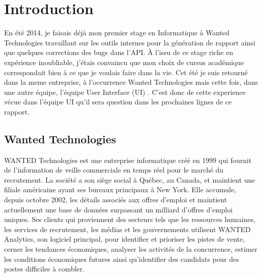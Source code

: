 
%
%

\chapter{Introduction}
\label{s:intro}

En été 2014, je faisais déjà mon premier stage en Informatique à Wanted Technologies travaillant sur les outils internes pour la génération de rapport ainsi que quelques corrections des bugs dans l'API. À l'issu de ce stage riche en expérience inoubliable, j'étais convaincu que mon choix de cursus académique correspondait bien à ce que je voulais faire dans la vie.
Cet été je suis retourné dans la meme entreprise, à l'occurrence Wanted Technologies mais cette fois, dans une autre équipe, l'équipe User Interface (UI) . C'est donc de cette experience vécue dans l'équipe UI qu'il sera question dans les prochaines lignes de ce rapport. 


\section{Wanted Technologies}
\label{about_wanted}

WANTED Technologies est une entreprise informatique créé en 1999 qui fournit de l'information de veille commerciale en temps réel pour le marché du recrutement. La société a son siège social à Québec, au Canada, et maintient une filiale américaine ayant ses bureaux principaux à New York. Elle accumule, depuis octobre 2002, les détails associés aux offres d'emploi et maintient actuellement une base de données surpassant un milliard d'offres d'emploi uniques.
Ses clients qui proviennent des secteurs tels que  les ressources humaines, les services de recrutement, les médias et les gouvernements utilisent WANTED Analytics, son logiciel principal,  pour identifier et prioriser les pistes de vente, cerner les tendances économiques, analyser les activités de la concurrence, estimer les conditions économiques futures ainsi qu'identifier des candidats pour des postes difficiles à combler.  \cite{REF01}

